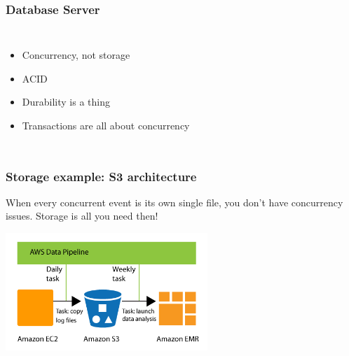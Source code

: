 \documentclass[xcolor=dvipsnames]{beamer}
\begin{document}
{
 
  \begin{frame}
    \frametitle{Database Server}

    \begin{columns}[c]

      \begin{itemize}
      \item Concurrency, not storage
      \item ACID
      \item Durability is a thing
      \item Transactions are all about concurrency
      \end{itemize}
      
    \end{columns}

  \end{frame}
}

\begin{frame}
  \frametitle{Storage example: S3 architecture}

  When every concurrent event is its own single file, you don't have
  concurrency issues. Storage is all you need then!

  \begin{center}
    \includegraphics[height=12em]{dp-how-dp-works-v2.png}
  \end{center}

\end{frame}
\end{document}
